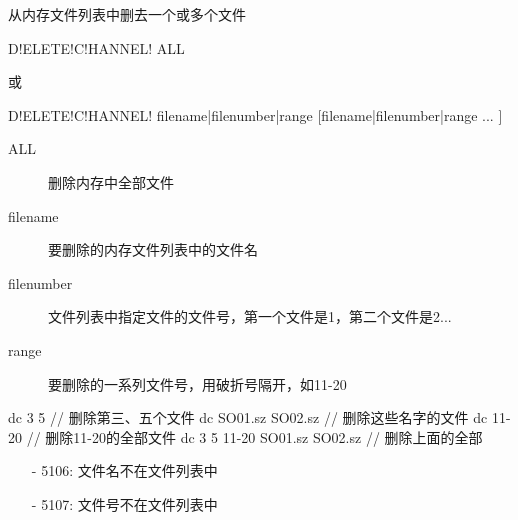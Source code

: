 \label{cmd:deletechannel}

从内存文件列表中删去一个或多个文件

\begin{SACSTX}
D!ELETE!C!HANNEL! ALL
\end{SACSTX}
或
\begin{SACSTX}
D!ELETE!C!HANNEL! filename|filenumber|range [filename|filenumber|range ... ]
\end{SACSTX}

\begin{description}
\item [ALL] 删除内存中全部文件
\item [filename] 要删除的内存文件列表中的文件名
\item [filenumber] 文件列表中指定文件的文件号，第一个文件是1，第二个文件是2...
\item [range] 要删除的一系列文件号，用破折号隔开，如11-20
\end{description}

\begin{SACCode}
  dc 3 5                         // 删除第三、五个文件
  dc SO01.sz SO02.sz             // 删除这些名字的文件
  dc 11-20                       // 删除11-20的全部文件
  dc 3 5 11-20 SO01.sz SO02.sz   // 删除上面的全部
\end{SACCode}

\begin{itemize}
\item[-]5106: 文件名不在文件列表中
\item[-]5107: 文件号不在文件列表中
\end{itemize}

